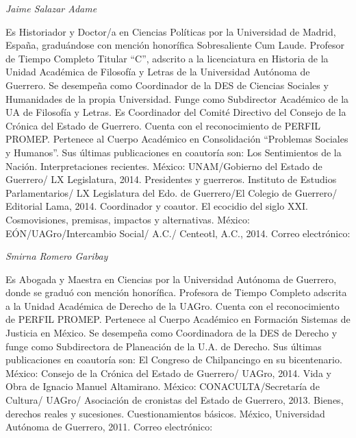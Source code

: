 \bigskip

{ 
\textit{Jaime Salazar Adame}}

{ 
Es Historiador  y Doctor/a en Ciencias Políticas por la Universidad de
Madrid, España, graduándose con mención honorífica Sobresaliente Cum Laude.
Profesor de Tiempo Completo Titular “C”, adscrito a la licenciatura en
Historia de la Unidad Académica de Filosofía y Letras de la Universidad
Autónoma de Guerrero. Se desempeña como Coordinador de la DES de Ciencias
Sociales y Humanidades de la propia Universidad. Funge como Subdirector
Académico de la UA de Filosofía y Letras. Es Coordinador del Comité
Directivo del Consejo de la Crónica del Estado de Guerrero. Cuenta con el
reconocimiento de PERFIL PROMEP.  Pertenece al Cuerpo Académico en
Consolidación “Problemas Sociales y Humanos”. Sus últimas publicaciones en
coautoría son: Los Sentimientos de la Nación. Interpretaciones recientes.
México: UNAM/Gobierno del Estado de Guerrero/ LX Legislatura, 2014.
Presidentes y guerreros. Instituto de Estudios Parlamentarios/ LX
Legislatura del Edo. de Guerrero/El Colegio de Guerrero/ Editorial Lama,
2014. Coordinador y coautor. El ecocidio del siglo XXI. Cosmovisiones,
premisas, impactos y alternativas. México: EÓN/UAGro/Intercambio Social/
A.C./ Centeotl, A.C., 2014. Correo electrónico:
\href{mailto:jaime48sa@hotmail.com}{}
 }


\bigskip

{ 
\textit{Smirna Romero Garibay}}

{ 
Es  Abogada y Maestra en Ciencias por la Universidad Autónoma de Guerrero,
donde se graduó con mención honorífica.  Profesora de Tiempo Completo
adscrita a la Unidad Académica de Derecho de la UAGro.  Cuenta con el
reconocimiento de PERFIL PROMEP. Pertenece al Cuerpo Académico en Formación
Sistemas de Justicia en México. Se desempeña como Coordinadora de la DES de
Derecho  y funge como Subdirectora de Planeación de la U.A. de Derecho. 
Sus últimas publicaciones en coautoría son: El Congreso de Chilpancingo en
su bicentenario. México: Consejo de la Crónica del Estado de Guerrero/
UAGro, 2014.  Vida y Obra de Ignacio Manuel Altamirano. México:
CONACULTA/Secretaría de Cultura/ UAGro/ Asociación de cronistas del Estado
de Guerrero, 2013. Bienes, derechos reales y sucesiones. Cuestionamientos
básicos. México, Universidad Autónoma de Guerrero, 2011. Correo
electrónico:
\href{mailto:smro07@yahoo.com.mx}{}}


\bigskip

